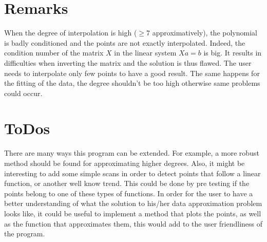 \documentclass[12pt]{article}
\begin{document}
\section{Remarks}
When the degree of interpolation is high ($\ge 7$ approximatively), the polynomial is badly conditioned and the points are not exactly interpolated. Indeed, the condition number of the matrix $X$ in the linear system $Xa=b$ is big. It results in difficulties when inverting the matrix and the solution is thus flawed. The user needs to interpolate only few points to have a good result.
The same happens for the fitting of the data, the degree shouldn't be too high otherwise same problems could occur.


\section{ToDos}
There are many ways this program can be extended. For example, a more robust method should be found for approximating higher degrees. Also, it might be interesting to add some simple scans in order to detect points that follow a linear function, or another well know trend. This could be done by pre testing if the points belong to one of these types of functions.
In order for the user to have a better understanding of what the solution to his/her data approximation problem looks like, it could be useful to implement a method that plots the points, as well as the function that approximates them, this would add to the user friendliness of the program.
 
\end{document}
